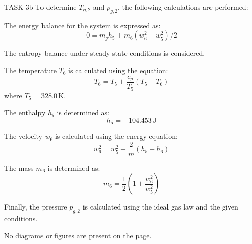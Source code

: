 TASK 3b  
To determine \( T_{g,2} \) and \( p_{g,2} \), the following calculations are performed:  

The energy balance for the system is expressed as:  
\[
0 = m_g h_5 + m_6 \left( w_6^2 - w_5^2 \right) / 2
\]  

The entropy balance under steady-state conditions is considered.  

The temperature \( T_6 \) is calculated using the equation:  
\[
T_6 = T_5 + \frac{c_p}{T_5} \left( T_5 - T_6 \right)
\]  
where \( T_5 = 328.0 \, \text{K} \).  

The enthalpy \( h_5 \) is determined as:  
\[
h_5 = -104.453 \, \text{J}
\]  

The velocity \( w_6 \) is calculated using the energy equation:  
\[
w_6^2 = w_5^2 + \frac{2}{m} \left( h_5 - h_6 \right)
\]  

The mass \( m_6 \) is determined as:  
\[
m_6 = \frac{1}{2} \left( 1 + \frac{w_6^2}{w_5^2} \right)
\]  

Finally, the pressure \( p_{g,2} \) is calculated using the ideal gas law and the given conditions.  

No diagrams or figures are present on the page.